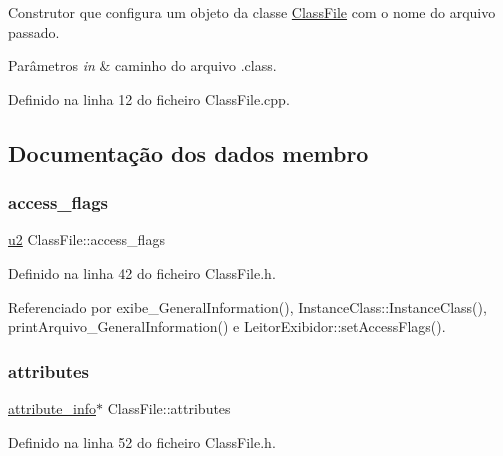 Construtor que configura um objeto da classe \hyperlink{classClassFile}{Class\+File} com o nome do arquivo passado. 


\begin{DoxyParams}{Parâmetros}
{\em in} & caminho do arquivo .class. \\
\hline
\end{DoxyParams}


Definido na linha 12 do ficheiro Class\+File.\+cpp.



\subsection{Documentação dos dados membro}
\mbox{\label{classClassFile_ae88db578147f7ee0d6fc1aeacb341854}} 
\subsubsection{\texorpdfstring{access\+\_\+flags}{access\_flags}}
{\footnotesize\ttfamily \hyperlink{BasicTypes_8h_a732cde1300aafb73b0ea6c2558a7a54f}{u2} Class\+File\+::access\+\_\+flags}



Definido na linha 42 do ficheiro Class\+File.\+h.



Referenciado por exibe\+\_\+\+General\+Information(), Instance\+Class\+::\+Instance\+Class(), print\+Arquivo\+\_\+\+General\+Information() e Leitor\+Exibidor\+::set\+Access\+Flags().

\mbox{\label{classClassFile_a8bf809db8e1008f401dc3cda5e9cdb14}} 
\subsubsection{\texorpdfstring{attributes}{attributes}}
{\footnotesize\ttfamily \hyperlink{structattribute__info}{attribute\+\_\+info}$\ast$ Class\+File\+::attributes}



Definido na linha 52 do ficheiro Class\+File.\+h.



